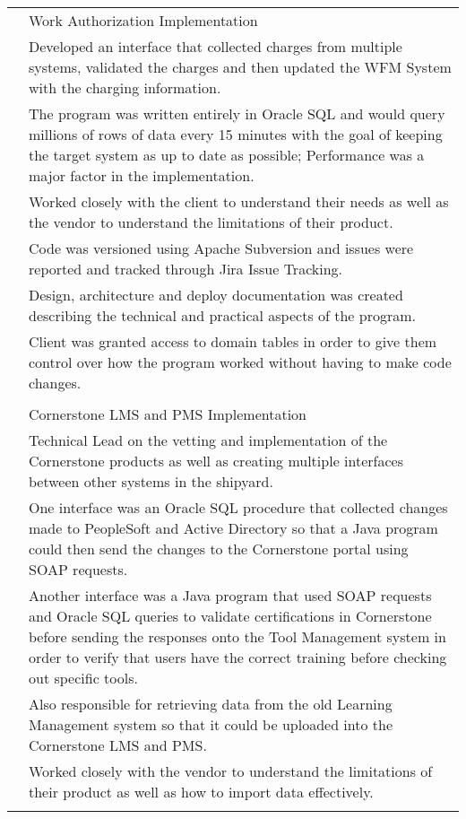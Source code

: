 \documentclass[12pt]{article}
\begin{document}
\begin{tabular}{p{2.3cm}|p{15.4cm}}
	\centering 2018 & Work Authorization Implementation\\&\small{Developed an interface that collected charges from multiple systems, validated the charges and then updated the WFM System with the charging information.}\\&\small{The program was written entirely in Oracle SQL and would query millions of rows of data every 15 minutes with the goal of keeping the target system as up to date as possible; Performance was a major factor in the implementation.}\\&\small{Worked closely with the client to understand their needs as well as the vendor to understand the limitations of their product.}\\&\small{Code was versioned using Apache Subversion and issues were reported and tracked through Jira Issue Tracking.}\\&\small{Design, architecture and deploy documentation was created describing the technical and practical aspects of the program.}\\&\small{Client was granted access to domain tables in order to give them control over how the program worked without having to make code changes.}\\\multicolumn{2}{c}{} \\
	\centering 2017 & Cornerstone LMS and PMS Implementation\\&\small{Technical Lead on the vetting and implementation of the Cornerstone products as well as creating multiple interfaces between other systems in the shipyard.}\\&\small{One interface was an Oracle SQL procedure that collected changes made to PeopleSoft and Active Directory so that a Java program could then send the changes to the Cornerstone portal using SOAP requests.}\\&\small{Another interface was a Java program that used SOAP requests and Oracle SQL queries to validate certifications in Cornerstone before sending the responses onto the Tool Management system in order to verify that users have the correct training before checking out specific tools.}\\&\small{Also responsible for retrieving data from the old Learning Management system so that it could be uploaded into the Cornerstone LMS and PMS.}\\&\small{Worked closely with the vendor to understand the limitations of their product as well as how to import data effectively.}\\\multicolumn{2}{c}{} \\

\end{tabular}
\end{document}
